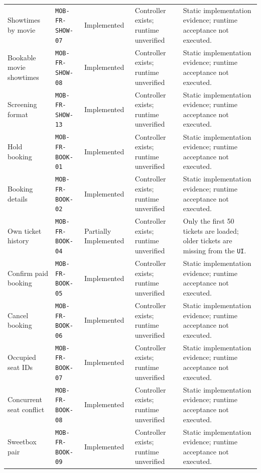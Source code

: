 \begin{longtable}{@{}P{0.19000\SRSWidth}P{0.18000\SRSWidth}P{0.15000\SRSWidth}P{0.20000\SRSWidth}P{0.28000\SRSWidth}@{}}
Showtimes by movie & \texttt{MOB-\allowbreak{}FR-\allowbreak{}SHOW-\allowbreak{}07} & Implemented & Controller exists; runtime unverified & Static implementation evidence; runtime acceptance not executed. \\[3pt]
Bookable movie showtimes & \texttt{MOB-\allowbreak{}FR-\allowbreak{}SHOW-\allowbreak{}08} & Implemented & Controller exists; runtime unverified & Static implementation evidence; runtime acceptance not executed. \\[3pt]
Screening format & \texttt{MOB-\allowbreak{}FR-\allowbreak{}SHOW-\allowbreak{}13} & Implemented & Controller exists; runtime unverified & Static implementation evidence; runtime acceptance not executed. \\[3pt]
Hold booking & \texttt{MOB-\allowbreak{}FR-\allowbreak{}BOOK-\allowbreak{}01} & Implemented & Controller exists; runtime unverified & Static implementation evidence; runtime acceptance not executed. \\[3pt]
Booking details & \texttt{MOB-\allowbreak{}FR-\allowbreak{}BOOK-\allowbreak{}02} & Implemented & Controller exists; runtime unverified & Static implementation evidence; runtime acceptance not executed. \\[3pt]
Own ticket history & \texttt{MOB-\allowbreak{}FR-\allowbreak{}BOOK-\allowbreak{}04} & Partially Implemented & Controller exists; runtime unverified & Only the first 50 tickets are loaded; older tickets are missing from the \texttt{UI}. \\[3pt]
Confirm paid booking & \texttt{MOB-\allowbreak{}FR-\allowbreak{}BOOK-\allowbreak{}05} & Implemented & Controller exists; runtime unverified & Static implementation evidence; runtime acceptance not executed. \\[3pt]
Cancel booking & \texttt{MOB-\allowbreak{}FR-\allowbreak{}BOOK-\allowbreak{}06} & Implemented & Controller exists; runtime unverified & Static implementation evidence; runtime acceptance not executed. \\[3pt]
Occupied seat IDs & \texttt{MOB-\allowbreak{}FR-\allowbreak{}BOOK-\allowbreak{}07} & Implemented & Controller exists; runtime unverified & Static implementation evidence; runtime acceptance not executed. \\[3pt]
Concurrent seat conflict & \texttt{MOB-\allowbreak{}FR-\allowbreak{}BOOK-\allowbreak{}08} & Implemented & Controller exists; runtime unverified & Static implementation evidence; runtime acceptance not executed. \\[3pt]
Sweetbox pair & \texttt{MOB-\allowbreak{}FR-\allowbreak{}BOOK-\allowbreak{}09} & Implemented & Controller exists; runtime unverified & Static implementation evidence; runtime acceptance not executed. \\[3pt]

\end{longtable}
